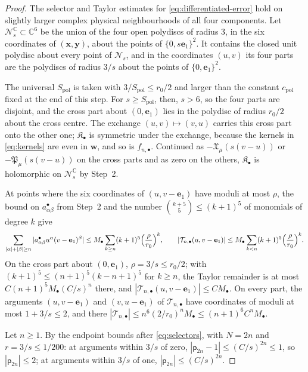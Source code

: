 \documentclass[11pt]{amsart}
\numberwithin{equation}{section}
\theoremstyle{definition}
\newcommand{\C}{\mathbb C}
\newcommand{\bx}{\mathbf x}
\newcommand{\by}{\mathbf y}
\newcommand{\eone}{\mathbf e_1}
\begin{document}
\begin{proof}
The selector and Taylor estimates for \eqref{eq:differentiated-error}
hold on slightly larger complex physical neighbourhoods of all four
components. Let
\(\mathcal N_s^{\C}\subset\C^6\) be the union of the four open
polydiscs of radius \(3\), in the six coordinates of \((\bx,\by)\),
about the points of \(\{0,s\eone\}^2\). It contains the closed unit
polydisc about every point of \(\mathcal N_s\), and in the coordinates
\((u,v)\) its four parts are the polydiscs of radius \(3/s\) about the
points of \(\{0,\eone\}^2\).

The universal \(S_{\mathrm{pol}}\) is taken with
\(3/S_{\mathrm{pol}}\le r_0/2\) and larger than the constant \(c_{\mathrm{pol}}\)
fixed at the end of this step. For \(s\ge S_{\mathrm{pol}}\), then,
\(s>6\), so the four parts are disjoint, and the cross part about
\((0,\eone)\) lies in the polydisc of radius \(r_0/2\) about the cross
centre. The exchange \((u,v)\mapsto(v,u)\) carries this cross part onto
the other one; \(\mathfrak K_\bullet\) is symmetric under the exchange,
because the kernels in \eqref{eq:kernels} are even in \(\mathbf w\),
and so is \(f_{n,\bullet}\). Continued as \(-\mathfrak X_\mu(s(v-u))\)
or \(-\mathfrak P_\mu(s(v-u))\) on the cross parts and as zero on the
others, \(\mathfrak K_\bullet\) is holomorphic on \(\mathcal N_s^{\C}\)
by Step~2.

At points where the six coordinates of \((u,v-\eone)\) have moduli at
most \(\rho\), the bound on \(a^\bullet_{\alpha\beta}\) from Step~2 and
the number \(\binom{k+5}{5}\le(k+1)^5\) of monomials of degree \(k\)
give
\[
 \sum_{|\alpha|+|\beta|\ge n}
 |a^\bullet_{\alpha\beta}u^\alpha(v-\eone)^\beta|
 \le M_\bullet\sum_{k\ge n}(k+1)^5\Bigl(\frac\rho{r_0}\Bigr)^k,
 \qquad
 |\mathcal T_{n,\bullet}(u,v-\eone)|
 \le M_\bullet\sum_{k<n}(k+1)^5\Bigl(\frac\rho{r_0}\Bigr)^k .
\]
On the cross part about \((0,\eone)\), \(\rho=3/s\le r_0/2\); with
\((k+1)^5\le(n+1)^5(k-n+1)^5\) for \(k\ge n\), the Taylor remainder is
at most \(C(n+1)^5M_\bullet(C/s)^n\) there, and
\(|\mathcal T_{n,\bullet}(u,v-\eone)|\le CM_\bullet\). On every part,
the arguments \((u,v-\eone)\) and \((v,u-\eone)\) of
\(\mathcal T_{n,\bullet}\) have coordinates of moduli at most
\(1+3/s\le2\), and there
\(|\mathcal T_{n,\bullet}|\le n^6(2/r_0)^nM_\bullet\le(n+1)^6C^nM_\bullet\).

Let \(n\ge1\). By the endpoint bounds after \eqref{eq:selectors}, with
\(N=2n\) and \(r=3/s\le1/200\): at arguments within \(3/s\) of zero,
\(|\mathsf p_{2n}-1|\le(C/s)^{2n}\le1\), so \(|\mathsf p_{2n}|\le2\);
at arguments within \(3/s\) of one, \(|\mathsf p_{2n}|\le(C/s)^{2n}\).


\end{proof}
\end{document}

